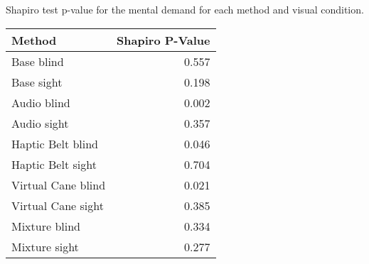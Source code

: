 
\centering
\caption{Shapiro test p-value for the mental demand for each method and visual condition.}
\label{tab:shapiro_mental_demand}
\begin{tabular}{lr}
\toprule
            Method &  Shapiro P-Value \\
\midrule
        Base blind &            0.557 \\
        Base sight &            0.198 \\
       Audio blind &            0.002 \\
       Audio sight &            0.357 \\
 Haptic Belt blind &            0.046 \\
 Haptic Belt sight &            0.704 \\
Virtual Cane blind &            0.021 \\
Virtual Cane sight &            0.385 \\
     Mixture blind &            0.334 \\
     Mixture sight &            0.277 \\
\bottomrule
\end{tabular}
